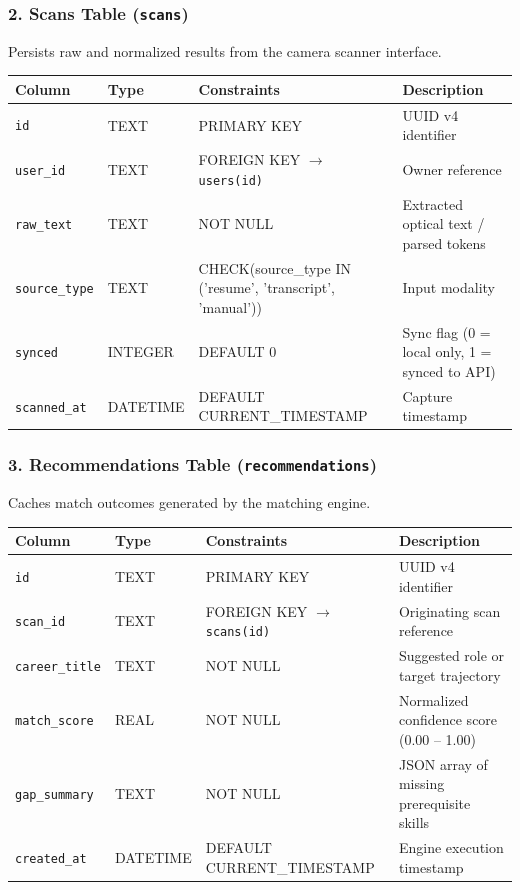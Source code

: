 \subsubsection{2. Scans Table (\texttt{scans})}
Persists raw and normalized results from the camera scanner interface.
\begin{center}
\begin{tabular}{@{}llll@{}}
\toprule
\textbf{Column} & \textbf{Type} & \textbf{Constraints} & \textbf{Description} \\ \midrule
\texttt{id} & TEXT & PRIMARY KEY & UUID v4 identifier \\
\texttt{user\_id} & TEXT & FOREIGN KEY $\to$ \texttt{users(id)} & Owner reference \\
\texttt{raw\_text} & TEXT & NOT NULL & Extracted optical text / parsed tokens \\
\texttt{source\_type} & TEXT & CHECK(source\_type IN ('resume', 'transcript', 'manual')) & Input modality \\
\texttt{synced} & INTEGER & DEFAULT 0 & Sync flag (0 = local only, 1 = synced to API) \\
\texttt{scanned\_at} & DATETIME & DEFAULT CURRENT\_TIMESTAMP & Capture timestamp \\ \bottomrule
\end{tabular}
\end{center}

\subsubsection{3. Recommendations Table (\texttt{recommendations})}
Caches match outcomes generated by the matching engine.
\begin{center}
\begin{tabular}{@{}llll@{}}
\toprule
\textbf{Column} & \textbf{Type} & \textbf{Constraints} & \textbf{Description} \\ \midrule
\texttt{id} & TEXT & PRIMARY KEY & UUID v4 identifier \\
\texttt{scan\_id} & TEXT & FOREIGN KEY $\to$ \texttt{scans(id)} & Originating scan reference \\
\texttt{career\_title} & TEXT & NOT NULL & Suggested role or target trajectory \\
\texttt{match\_score} & REAL & NOT NULL & Normalized confidence score (0.00 -- 1.00) \\
\texttt{gap\_summary} & TEXT & NOT NULL & JSON array of missing prerequisite skills \\
\texttt{created\_at} & DATETIME & DEFAULT CURRENT\_TIMESTAMP & Engine execution timestamp \\ \bottomrule
\end{tabular}
\end{center}


